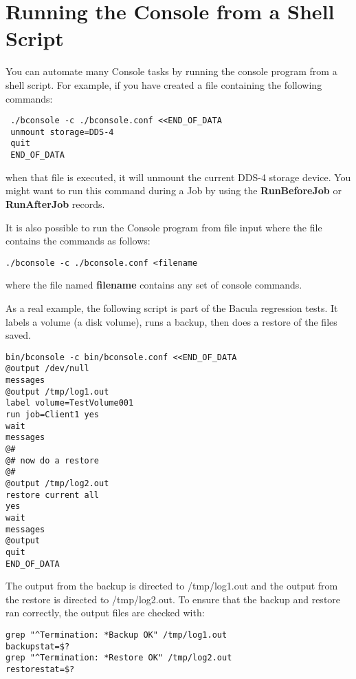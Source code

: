 \label{scripting}
\section{Running the Console from a Shell Script}

You can automate many Console tasks by running the console program from a
shell script. For example, if you have created a file containing the following
commands: 

\footnotesize
\begin{verbatim}
 ./bconsole -c ./bconsole.conf <<END_OF_DATA
 unmount storage=DDS-4
 quit
 END_OF_DATA
\end{verbatim}
\normalsize

when that file is executed, it will unmount the current DDS-4 storage device.
You might want to run this command during a Job by using the {\bf
RunBeforeJob} or {\bf RunAfterJob} records. 

It is also possible to run the Console program from file input where the file
contains the commands as follows: 

\footnotesize
\begin{verbatim}
./bconsole -c ./bconsole.conf <filename
\end{verbatim}
\normalsize

where the file named {\bf filename} contains any set of console commands. 

As a real example, the following script is part of the Bacula regression
tests. It labels a volume (a disk volume), runs a backup, then does a restore
of the files saved. 

\footnotesize
\begin{verbatim}
bin/bconsole -c bin/bconsole.conf <<END_OF_DATA
@output /dev/null
messages
@output /tmp/log1.out
label volume=TestVolume001
run job=Client1 yes
wait
messages
@#
@# now do a restore
@#
@output /tmp/log2.out
restore current all
yes
wait
messages
@output
quit
END_OF_DATA
\end{verbatim}
\normalsize

The output from the backup is directed to /tmp/log1.out and the output from
the restore is directed to /tmp/log2.out. To ensure that the backup and
restore ran correctly, the output files are checked with: 

\footnotesize
\begin{verbatim}
grep "^Termination: *Backup OK" /tmp/log1.out
backupstat=$?
grep "^Termination: *Restore OK" /tmp/log2.out
restorestat=$?
\end{verbatim}
\normalsize

